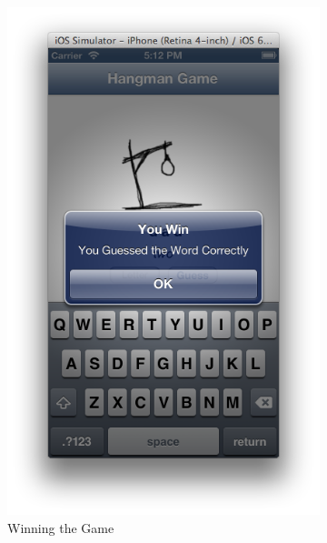 \documentclass[11pt, a4paper]{article}
\begin{document}
\begin{figure}[h]
\begin{subfigure}[b]{0.3\textwidth}
\includegraphics[width=\textwidth]{img/hangman-win}
\caption{Winning the Game}
\end{subfigure}
\begin{subfigure}[b]{0.3\textwidth}

\end{subfigure}
\end{figure}
\end{document}
